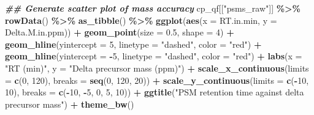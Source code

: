 \documentclass[9pt,a4paper,]{extarticle}
\newenvironment{Shaded}{\begin{snugshade}}{\end{snugshade}}
\newcommand{\AttributeTok}[1]{\textcolor[rgb]{0.13,0.29,0.53}{#1}}
\newcommand{\DecValTok}[1]{\textcolor[rgb]{0.00,0.00,0.81}{#1}}
\newcommand{\DocumentationTok}[1]{\textcolor[rgb]{0.56,0.35,0.01}{\textbf{\textit{#1}}}}
\newcommand{\FloatTok}[1]{\textcolor[rgb]{0.00,0.00,0.81}{#1}}
\newcommand{\FunctionTok}[1]{\textcolor[rgb]{0.13,0.29,0.53}{\textbf{#1}}}
\newcommand{\NormalTok}[1]{#1}
\newcommand{\SpecialCharTok}[1]{\textcolor[rgb]{0.81,0.36,0.00}{\textbf{#1}}}
\newcommand{\StringTok}[1]{\textcolor[rgb]{0.31,0.60,0.02}{#1}}
\begin{document}
\begin{Shaded}
\begin{Highlighting}[]
\DocumentationTok{\#\# Generate scatter plot of mass accuracy}
\NormalTok{cp\_qf[[}\StringTok{"psms\_raw"}\NormalTok{]] }\SpecialCharTok{\%\textgreater{}\%}
  \FunctionTok{rowData}\NormalTok{() }\SpecialCharTok{\%\textgreater{}\%} 
  \FunctionTok{as\_tibble}\NormalTok{() }\SpecialCharTok{\%\textgreater{}\%}
  \FunctionTok{ggplot}\NormalTok{(}\FunctionTok{aes}\NormalTok{(}\AttributeTok{x =}\NormalTok{ RT.in.min, }\AttributeTok{y =}\NormalTok{ Delta.M.in.ppm)) }\SpecialCharTok{+}
  \FunctionTok{geom\_point}\NormalTok{(}\AttributeTok{size =} \FloatTok{0.5}\NormalTok{, }\AttributeTok{shape =} \DecValTok{4}\NormalTok{) }\SpecialCharTok{+}
  \FunctionTok{geom\_hline}\NormalTok{(}\AttributeTok{yintercept =} \DecValTok{5}\NormalTok{, }\AttributeTok{linetype =} \StringTok{"dashed"}\NormalTok{, }\AttributeTok{color =} \StringTok{"red"}\NormalTok{) }\SpecialCharTok{+}
  \FunctionTok{geom\_hline}\NormalTok{(}\AttributeTok{yintercept =} \SpecialCharTok{{-}}\DecValTok{5}\NormalTok{, }\AttributeTok{linetype =} \StringTok{"dashed"}\NormalTok{, }\AttributeTok{color =} \StringTok{"red"}\NormalTok{) }\SpecialCharTok{+}
  \FunctionTok{labs}\NormalTok{(}\AttributeTok{x =} \StringTok{"RT (min)"}\NormalTok{, }\AttributeTok{y =} \StringTok{"Delta precursor mass (ppm)"}\NormalTok{) }\SpecialCharTok{+}
  \FunctionTok{scale\_x\_continuous}\NormalTok{(}\AttributeTok{limits =} \FunctionTok{c}\NormalTok{(}\DecValTok{0}\NormalTok{, }\DecValTok{120}\NormalTok{), }\AttributeTok{breaks =} \FunctionTok{seq}\NormalTok{(}\DecValTok{0}\NormalTok{, }\DecValTok{120}\NormalTok{, }\DecValTok{20}\NormalTok{)) }\SpecialCharTok{+}
  \FunctionTok{scale\_y\_continuous}\NormalTok{(}\AttributeTok{limits =} \FunctionTok{c}\NormalTok{(}\SpecialCharTok{{-}}\DecValTok{10}\NormalTok{, }\DecValTok{10}\NormalTok{), }\AttributeTok{breaks =} \FunctionTok{c}\NormalTok{(}\SpecialCharTok{{-}}\DecValTok{10}\NormalTok{, }\SpecialCharTok{{-}}\DecValTok{5}\NormalTok{, }\DecValTok{0}\NormalTok{, }\DecValTok{5}\NormalTok{, }\DecValTok{10}\NormalTok{)) }\SpecialCharTok{+}
  \FunctionTok{ggtitle}\NormalTok{(}\StringTok{"PSM retention time against delta precursor mass"}\NormalTok{) }\SpecialCharTok{+}
  \FunctionTok{theme\_bw}\NormalTok{()}
\end{Highlighting}
\end{Shaded}
\end{document}
